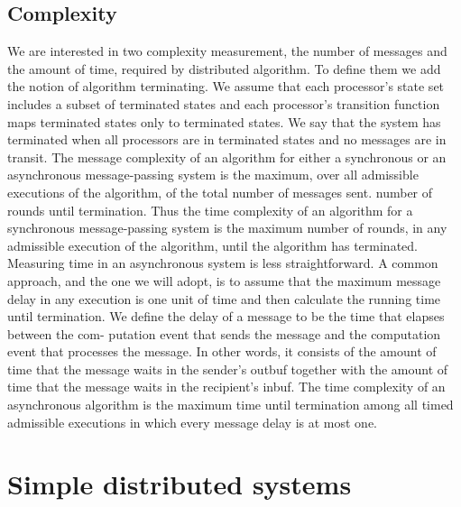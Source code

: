 \documentclass{article}
\begin{document}
\subsection{Complexity}
We are interested in two complexity measurement, the number of messages and the amount of time, required by distributed algorithm.
To define them we add the notion of algorithm terminating.
We assume that each processor's state set includes a subset of terminated states and each 
processor's transition function maps terminated states only to terminated states. We 
say that the system has terminated when all processors are in terminated 
states and no messages are in transit.
The message complexity of an algorithm for either a synchronous or an asynchronous message-passing system is the maximum, over all admissible executions of 
the algorithm, of the total number of messages sent. number of rounds until termination. Thus the time complexity of an algorithm for 
a synchronous message-passing system is the maximum number of rounds, in any 
admissible execution of the algorithm, until the algorithm has terminated.
Measuring time in an asynchronous system is less straightforward. A common 
approach, and the one we will adopt, is to assume that the maximum message delay in 
any execution is one unit of time and then calculate the running time until termination. 
We define the delay of a message to be the time that elapses between the com- 
putation event that sends the message and the computation event that processes the 
message. In other words, it consists of the amount of time that the message waits in 
the sender's outbuf together with the amount of time that the message waits in the 
recipient's inbuf. 
The time complexity of an asynchronous algorithm is the maximum time until 
termination among all timed admissible executions in which every message delay is 
at most one. 
 

 

\section{Simple distributed systems}
\end{document}
